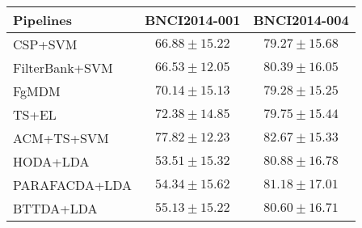 \begin{tabularx}{\linewidth}{@{}Xcc@{}}
\toprule
     Pipelines &             BNCI2014-001 &             BNCI2014-004 \\
\midrule
       CSP+SVM &          $66.88\pm15.22$ &          $79.27\pm15.68$ \\
FilterBank+SVM &          $66.53\pm12.05$ &          $80.39\pm16.05$ \\
         FgMDM &          $70.14\pm15.13$ &          $79.28\pm15.25$ \\
         TS+EL &          $72.38\pm14.85$ &          $79.75\pm15.44$ \\
    ACM+TS+SVM & \boldmath$77.82\pm12.23$ & \boldmath$82.67\pm15.33$ \\\midrule
      HODA+LDA &          $53.51\pm15.32$ &          $80.88\pm16.78$ \\
 PARAFACDA+LDA &          $54.34\pm15.62$ &          $81.18\pm17.01$ \\
     BTTDA+LDA &          $55.13\pm15.22$ &          $80.60\pm16.71$ \\
\bottomrule
\end{tabularx}
